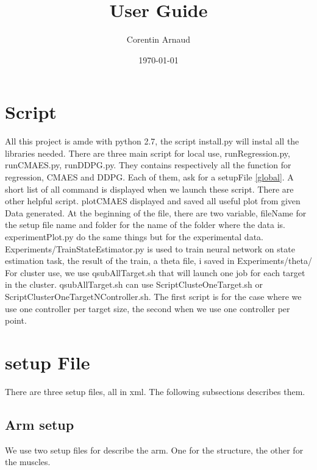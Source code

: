 \documentclass[a4paper]{article}
\title{User Guide}
\author{Corentin Arnaud}
\date{\today}
\begin{document}
\maketitle


\section{Script}
All this project is amde with python 2.7,  the script install.py will instal all the libraries needed.
There are three main script for local use, runRegression.py, runCMAES.py, runDDPG.py. They contains respectively all the function for regression, CMAES and DDPG. Each of them, ask for a setupFile \ref{global}. A short list of all command is displayed when we launch these script.
There are other helpful script. plotCMAES displayed and saved all useful plot from given Data generated. At the beginning of the file, there are two variable, fileName for the setup file name and folder for the name of the folder where the data is. experimentPlot.py do the same things but for the experimental data.
Experiments/TrainStateEstimator.py is used to train neural network on state estimation task, the result of the train, a theta file, i saved in Experiments/theta/
For cluster use, we use qsubAllTarget.sh that will launch one job for each target in the cluster. qsubAllTarget.sh can use ScriptClusteOneTarget.sh or ScriptClusterOneTargetNController.sh. The first script is for the case where we use one controller per target size, the second when we use one controller per point.


\section{setup File}
There are three setup files, all in xml. The following subsections describes them.
\subsection{Arm setup}
We use two setup files for describe the arm. One for the structure, the other for the muscles.
\end{document}
